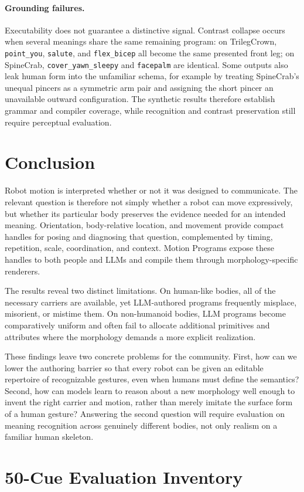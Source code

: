 \documentclass[letterpaper,10pt,conference]{ieeeconf}
\begin{document}
\paragraph{Grounding failures.}
Executability does not guarantee a distinctive signal. Contrast collapse occurs when several meanings share the same remaining program: on TrilegCrown, \texttt{point\_you}, \texttt{salute}, and \texttt{flex\_bicep} all become the same presented front leg; on SpineCrab, \texttt{cover\_yawn\_sleepy} and \texttt{facepalm} are identical. Some outputs also leak human form into the unfamiliar schema, for example by treating SpineCrab's unequal pincers as a symmetric arm pair and assigning the short pincer an unavailable outward configuration. The synthetic results therefore establish grammar and compiler coverage, while recognition and contrast preservation still require perceptual evaluation.

\section{Conclusion}
Robot motion is interpreted whether or not it was designed to communicate.
The relevant question is therefore not simply whether a robot can move expressively, but whether its particular body preserves the evidence needed for an intended meaning.
Orientation, body-relative location, and movement provide compact handles for posing and diagnosing that question, complemented by timing, repetition, scale, coordination, and context.
Motion Programs expose these handles to both people and LLMs and compile them through morphology-specific renderers.

The results reveal two distinct limitations.
On human-like bodies, all of the necessary carriers are available, yet LLM-authored programs frequently misplace, misorient, or mistime them.
On non-humanoid bodies, LLM programs become comparatively uniform and often fail to allocate additional primitives and attributes where the morphology demands a more explicit realization.

These findings leave two concrete problems for the community.
First, how can we lower the authoring barrier so that every robot can be given an editable repertoire of recognizable gestures, even when humans must define the semantics?
Second, how can models learn to reason about a new morphology well enough to invent the right carrier and motion, rather than merely imitate the surface form of a human gesture?
Answering the second question will require evaluation on meaning recognition across genuinely different bodies, not only realism on a familiar human skeleton.

\appendix

\section{50-Cue Evaluation Inventory}
\label{app:cue-inventory}


{\scriptsize


}
\end{document}
